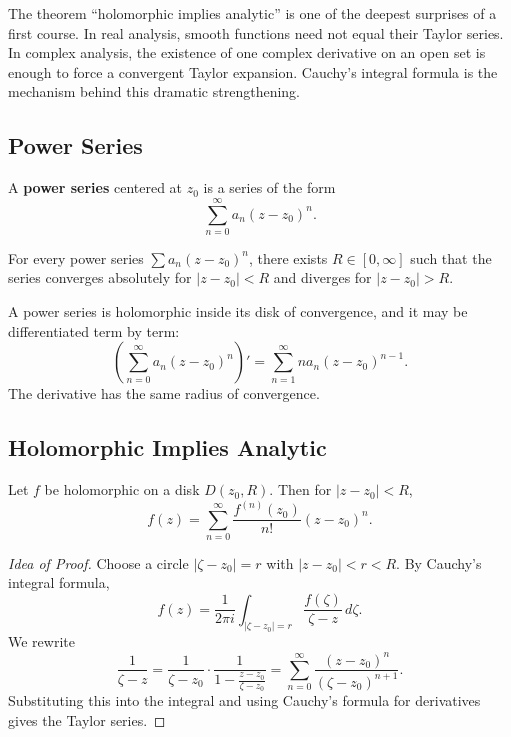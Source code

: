 The theorem ``holomorphic implies analytic'' is one of the deepest surprises of a first course. In real analysis, smooth functions need not equal their Taylor series. In complex analysis, the existence of one complex derivative on an open set is enough to force a convergent Taylor expansion. Cauchy's integral formula is the mechanism behind this dramatic strengthening.

\subsection{Power Series}

\begin{definition}
A \textbf{power series} centered at $z_0$ is a series of the form
\[
    \sum_{n=0}^{\infty}a_n(z-z_0)^n.
\]
\end{definition}

\begin{theorem}
For every power series $\sum a_n(z-z_0)^n$, there exists $R\in[0,\infty]$ such that the series converges absolutely for $|z-z_0|<R$ and diverges for $|z-z_0|>R$.
\end{theorem}

\begin{theorem}
A power series is holomorphic inside its disk of convergence, and it may be differentiated term by term:
\[
    \left(\sum_{n=0}^{\infty}a_n(z-z_0)^n\right)'
    =\sum_{n=1}^{\infty}na_n(z-z_0)^{n-1}.
\]
The derivative has the same radius of convergence.
\end{theorem}

\subsection{Holomorphic Implies Analytic}

\begin{theorem}
Let $f$ be holomorphic on a disk $D(z_0,R)$. Then for $|z-z_0|<R$,
\[
    f(z)=\sum_{n=0}^{\infty}\frac{f^{(n)}(z_0)}{n!}(z-z_0)^n.
\]
\end{theorem}

\begin{proof}[Idea of Proof]
Choose a circle $|\zeta-z_0|=r$ with $|z-z_0|<r<R$. By Cauchy's integral formula,
\[
    f(z)=\frac{1}{2\pi i}\int_{|\zeta-z_0|=r}\frac{f(\zeta)}{\zeta-z}\,d\zeta.
\]
We rewrite
\[
    \frac{1}{\zeta-z}=\frac{1}{\zeta-z_0}\cdot\frac{1}{1-\frac{z-z_0}{\zeta-z_0}}
    =\sum_{n=0}^{\infty}\frac{(z-z_0)^n}{(\zeta-z_0)^{n+1}}.
\]
Substituting this into the integral and using Cauchy's formula for derivatives gives the Taylor series.
\end{proof}

